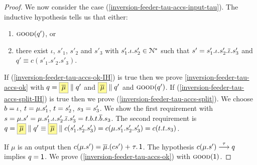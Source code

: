 \begin{proof}
We now consider the case (\ref{inversion-feeder-tau-accs-input-tau}).
The inductive hypothesis tells us that either:
\begin{enumerate}%
\item\label{inversion-feeder-tau-accs-ok-IH} $\textsc{good}(q')$, or
\item\label{inversion-feeder-tau-accs-split-IH} there exist $\iota$, $s'_1$, $s'_2$ and $s'_3$ with
  $s'_1.\iota.s'_2 \in \mathcal{N}^*$ such that
  $s' = s'_1.\iota.s'_2.\overline{\iota}.s'_3$ and
  $q' \equiv c(s'_1.s'_2.s'_3)$.
\end{enumerate}
If (\ref{inversion-feeder-tau-accs-ok-IH}) is true then
we prove \ref{inversion-feeder-tau-accs-ok} with
$q = \mailbox{ \co{\mu} } \Par q'$ and $\mailbox{ \co{\mu} }\Par q'$ and $ \textsc{good}(q')$.
If (\ref{inversion-feeder-tau-accs-split-IH}) is true then
we prove (\ref{inversion-feeder-tau-accs-split}).
We choose  $b = \iota$, $t = \mu.s'_1$, $t = s'_2$, $s_3 = s'_3$.
We show the first requirement with
$s = \mu.s' = \mu.s'_1.\iota.s'_2.\overline{\iota}.s'_3 = t.b.t.\overline{b}.s_3$.
The second requirement is $q = \mailbox{ \co{\mu} } \Par q' \equiv \mailbox{ \co{\mu} } \Par c(s'_1.s'_2.s'_3) = c(\mu.s'_1.s'_2.s'_3) = c(\traceA.\traceB.\traceC)$.

If $\mu$ is an output then $c(\mu.s') = \overline{\mu}.(c s') \mathrel{+} \tau.\mathop{\textsf{1}}$.
The hypothesis $c(\mu.s') \mathrel{\overset{\tau}\longrightarrow} q$ implies $q = \mathop{\textsf{1}}$.
We prove (\ref{inversion-feeder-tau-accs-ok}) with $\textsc{good}(\mathop{\textsf{1}})$.
\end{proof}








